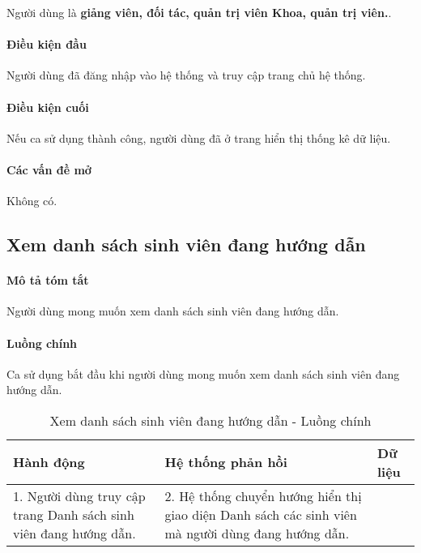 \documentclass[./../main.tex]{subfiles}
\begin{document}
Người dùng là \textbf{giảng viên, đối tác, quản trị viên Khoa, quản trị viên.}.

\paragraph*{Điều kiện đầu}

Người dùng đã đăng nhập vào hệ thống và truy cập trang chủ hệ thống.

\paragraph*{Điều kiện cuối}

Nếu ca sử dụng thành công, người dùng đã ở trang hiển thị thống kê dữ liệu.

\paragraph*{Các vấn đề mở}

Không có.

\subsection{Xem danh sách sinh viên đang hướng dẫn}

\paragraph*{Mô tả tóm tắt}

Người dùng mong muốn xem danh sách sinh viên đang hướng dẫn.

\paragraph*{Luồng chính} Ca sử dụng bắt đầu khi người dùng mong muốn xem danh sách sinh viên đang hướng dẫn.

\begin{table}[H]
	\caption{Xem danh sách sinh viên đang hướng dẫn - Luồng chính}
	\label{tab:view_assigned_students}
	\begin{tabularx}{\textwidth}{|X|X|X|}
		\hline
		\textbf{Hành động}                                               & \textbf{Hệ thống phản hồi}                                                                        & \textbf{Dữ liệu} \\ \hline
		1. Người dùng truy cập trang Danh sách sinh viên đang hướng dẫn. & 2. Hệ thống chuyển hướng hiển thị giao diện Danh sách các sinh viên mà người dùng đang hướng dẫn. &                  \\ \hline
	\end{tabularx}
\end{table}
\end{document}
